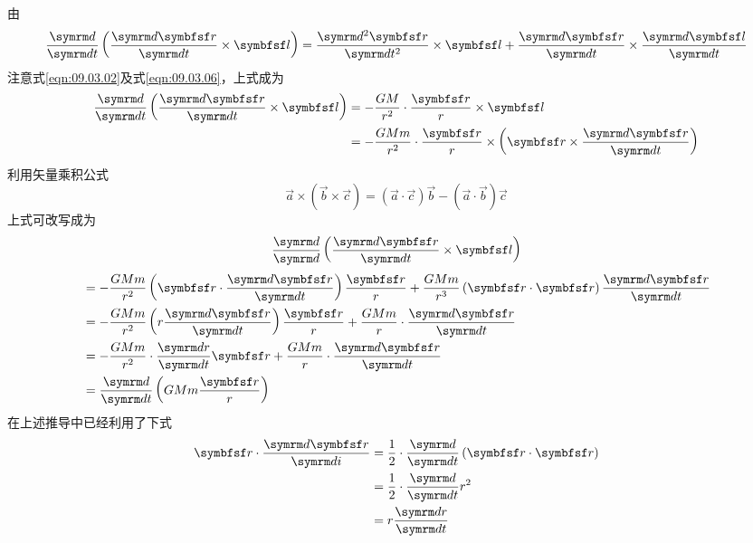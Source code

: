 由
\begin{equation*}
  \frac { \dif } { \dif t } \left( \frac { \dif \vec{r} } { \dif t } \times \vec{l} \right) = \frac { \dif ^ { 2 } \vec{r} } { \dif t ^ { 2 } } \times \vec{l} + \frac { \dif \vec{r} } { \dif t } \times \frac { \dif \vec{l}} { \dif t }
\end{equation*}
注意式\eqref{eqn:09.03.02}及式\eqref{eqn:09.03.06}，上式成为
\begin{equation*}
  \begin{split}
    \frac { \dif } { \dif t } \left( \frac { \dif \vec{r} } { \dif t } \times \vec{l} \right) &= - \frac { G M } { r ^ { 2 } } \cdot \frac { \vec{r} } { r } \times \vec{l} \\
    &= - \frac { G M m } { r ^ { 2 } } \cdot \frac { \vec{r} } { r } \times \left( \vec{r} \times \frac { \dif \vec{r} } { \dif t } \right)
  \end{split}
\end{equation*}
利用矢量乘积公式
\begin{equation}\label{eqn:09.03.08}
  \vec{a} \times \left( \vec{b} \times \vec{c} \right) = \left( \vec{a} \cdot \vec{c} \right) \vec{b} - \left( \vec{a} \cdot \vec{b} \right) \vec{c}
\end{equation}
上式可改写成为
\begin{equation*}
  \frac { \dif } { \dif } \left( \frac { \dif \vec{r} } { \dif t } \times \vec{l} \right)
\end{equation*}
\begin{equation}\label{eqn:09.03.09}
  \begin{split}
    &= - \frac { G M m } { r ^ { 2 } } \left( \vec{r} \cdot \frac { \dif \vec{r} } { \dif t } \right) \frac { \vec{r} } { r } + \frac { G M m } { r ^ { 3 } } \left( \vec{r} \cdot \vec{r} \right) \frac { \dif \vec{r} } { \dif t } \\
    &= - \frac { G M m } { r ^ { 2 } } \left( r \frac { \dif \vec{r} } { \dif t } \right) \frac { \vec{r} } { r } + \frac { G M m } { r } \cdot \frac { \dif \vec{r} } { \dif t } \\
    &= - \frac { G M m } { r ^ { 2 } } \cdot \frac { \dif r } { \dif t } \vec{r} + \frac { G M m } { r } \cdot \frac { \dif \vec{r} } { \dif t } \\
    &= \frac { \dif } { \dif t } \left( G M m \frac { \vec{r} } { r } \right)
  \end{split}
\end{equation}
在上述推导中已经利用了下式
\begin{equation*}
  \begin{split}
    \vec{r} \cdot \frac { \dif \vec{r} } { \dif i } &= \frac { 1 } { 2 } \cdot \frac { \dif } { \dif t } \left( \vec{r} \cdot \vec{r} \right) \\
    &= \frac { 1 } { 2 } \cdot \frac { \dif } { \dif t } r ^ { 2 } \\
    &= r \frac { \dif r } { \dif t }
  \end{split}
\end{equation*}
